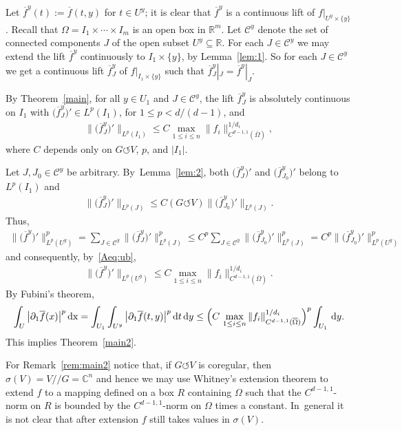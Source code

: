 \documentclass[pdftex]{sigma}
\numberwithin{equation}{section}
\def\si{\sigma}
\def\Om{\Omega}
\def\C{\mathbb{C}}
\def\R{\mathbb{R}}
\def\cC{\mathcal{C}}
\def\p{\partial}
\def\ol{\overline}
\def\cq{{/\!\!/}}
\def\acts{\circlearrowleft}
\begin{document}
 Let $\ol f^y (t) := \ol f(t,y)$ for $t \in U^y$; it is clear that $\ol f^y$ is a continuous lift of $f|_{U^y \times \{y\}}$.
 Recall that $\Om = I_1 \times \cdots \times I_m$ is an open box in $\R^m$.
Let $\cC^y$ denote the set of connected components $J$ of the open subset $U^y \subseteq \R$.	 		
For each $J \in \cC^y$ we may extend the lift $\ol f^y$ continuously to $I_1 \times \{y\}$, by Lemma~\ref{lem:1}.
So for each $J \in \cC^y$ we get a continuous lift $\ol f^y_J$ of $f|_{I_1 \times \{y\}}$
such that $\ol f^y_J|_J = \ol f^y|_J$.

By Theorem~\ref{main}, for all $y \in U_1$ and $J \in \cC^y$,
 the lift $\ol f^y_J$ is absolutely continuous on $I_1$ with $\big(\ol f^y_J\big)' \in L^p(I_1)$, for $1 \le p < d/(d-1)$, and
 \begin{gather} \label{Aeq:ub}
 \big\|\big(\ol f^y_J\big)'\big\|_{L^p(I_1)} \le C \max_{1 \le i \le n} \|f_i\|^{1/d_i}_{C^{d-1,1}(\overline \Om)},
 \end{gather}
where $C$ depends only on $G \acts V$, $p$, and $|I_1|$.

Let $J,J_0 \in \cC^y$ be arbitrary. By~Lemma~\ref{lem:2}, both $\big(\ol f^y_J\big)'$ and $\big(\ol f^y_{J_0}\big)'$ belong to $L^p(I_1)$ and
\begin{gather*}
	\big\| \big(\ol f^y_J\big)' \big\|_{L^p(J)} \le C(G \acts V) \big\| \big(\ol f^y_{J_0}\big)' \big\|_{L^p(J)}.
\end{gather*}
Thus,
 \begin{gather*}
 \big\|\big(\ol f^y\big)'\big\|^p_{L^p(U^y)}
= \sum_{J \in \cC^y} \big\|\big(\ol f^y_J\big)'\big\|^p_{L^p(J)}
 \le C^p \sum_{J \in \cC^y} \big\|\big(\ol f^y_{J_0}\big)'\big\|^p_{L^p(J)}
 = C^p \big\|\big(\ol f^y_{J_0}\big)'\big\|^p_{L^p(U^y)}
 \end{gather*}
 and consequently, by~\eqref{Aeq:ub},
 \begin{gather*}
 	\big\|\big(\ol f^y\big)'\big\|_{L^p(U^y)} \le C \max_{1 \le i \le n} \|f_i\|^{1/d_i}_{C^{d-1,1}(\overline \Om)}.
 \end{gather*}
 By Fubini's theorem,
 \begin{gather*}
 \int_{U} \big|\p_1 \ol f(x)\big|^p\, {\rm dx} = \int_{U_1} \int_{U^y} \big|\p_1 \ol f(t,y)\big|^p\, {\rm d}t\, {\rm d}y
 \le \Big(C \, \max_{1 \le i \le n} \|f_i\|^{1/d_i}_{C^{d-1,1}(\overline \Om)} \Big)^p \int_{U_1} \, {\rm d}y.
 \end{gather*}
 This implies Theorem~\ref{main2}.

For Remark~\ref{rem:main2} notice that,
if $G \acts V$ is coregular, then $\si(V) = V \cq G = \C^n$ and hence we may use Whitney's extension theorem
to extend $f$ to a mapping defined on a box $R$ containing $\Om$ such that the $C^{d-1,1}$-norm on $R$ is bounded
by the $C^{d-1,1}$-norm on $\Om$ times a constant. In~general it is not clear that after extension $f$ still takes values in $\si(V)$.
\end{document}
